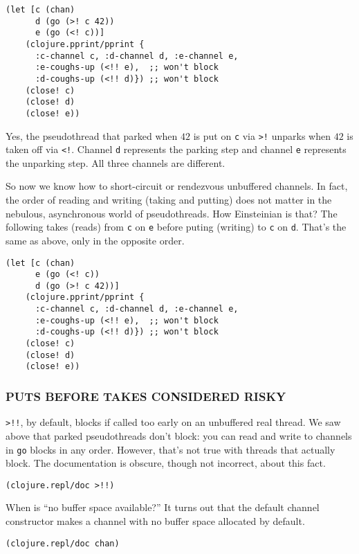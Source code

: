\documentclass[10pt,oneside,x11names]{article}
\begin{document}
\begin{verbatim}
(let [c (chan)
      d (go (>! c 42))
      e (go (<! c))]
    (clojure.pprint/pprint {
      :c-channel c, :d-channel d, :e-channel e,
      :e-coughs-up (<!! e),  ;; won't block
      :d-coughs-up (<!! d)}) ;; won't block
    (close! c)
    (close! d)
    (close! e))
\end{verbatim}

Yes, the pseudothread that parked when \(42\) is put on \texttt{c} via \texttt{>!}
unparks when \(42\) is taken off via \texttt{<!}. Channel \texttt{d} represents the
parking step and channel \texttt{e} represents the unparking step. All three
channels are different.

So now we know how to short-circuit or rendezvous unbuffered channels.
In fact, the order of reading and writing (taking and putting) does not
matter in the nebulous, asynchronous world of pseudothreads. How
Einsteinian is that? The following takes (reads) from \texttt{c} on \texttt{e} before
puting (writing) to \texttt{c} on \texttt{d}. That's the same as above, only in the
opposite order.

\begin{verbatim}
(let [c (chan)
      e (go (<! c))
      d (go (>! c 42))]
    (clojure.pprint/pprint {
      :c-channel c, :d-channel d, :e-channel e,
      :e-coughs-up (<!! e),  ;; won't block
      :d-coughs-up (<!! d)}) ;; won't block
    (close! c)
    (close! d)
    (close! e))
\end{verbatim}

\subsubsection{PUTS BEFORE TAKES CONSIDERED RISKY}
\label{puts-before-takes-considered-risky}
\texttt{>!!}, by default, blocks if called too early on an unbuffered real
thread. We saw above that parked pseudothreads don't block: you can read
and write to channels in \texttt{go} blocks in any order. However, that's not
true with threads that actually block. The documentation is obscure,
though not incorrect, about this fact.

\begin{verbatim}
(clojure.repl/doc >!!)
\end{verbatim}

When is ``no buffer space available?'' It turns out that the default
channel constructor makes a channel with no buffer space allocated by
default.

\begin{verbatim}
(clojure.repl/doc chan)
\end{verbatim}
\end{document}
